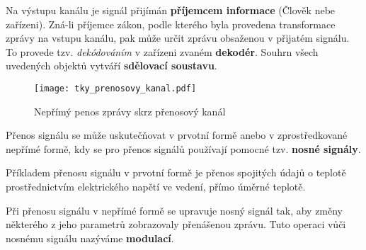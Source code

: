 {      Na výstupu kanálu je signál přijímán \textbf{příjemcem informace} (Člověk nebe zařízeni). 
      Zná-li příjemce zákon, podle kterého byla provedena transformace zprávy na vstupu kanálu, pak 
      může určit zprávu obsaženou v přijatém signálu. To provede tzv. \emph{dekódováním} v zařízeni 
      zvaném \textbf{dekodér}. Souhrn všech uvedených objektů vytváří \textbf{sdělovací soustavu}.

      \begin{figure}[ht!]
        \centering
        \texttt{[image: tky\_prenosovy\_kanal.pdf]}
        \caption{Nepřímý penos zprávy skrz přenosový kanál}
        \label{tky:fig002}
      \end{figure}

      Přenos signálu se může uskutečňovat v prvotní formě anebo v zprostředkované nepřímé formě, 
      kdy se pro přenos signálů používají pomocné tzv. \textbf{nosné signály}.
      
      Příkladem přenosu signálu v prvotní formě je přenos spojitých údajů o teplotě     
      prostřednictvím elektrického napětí ve vedení, přímo úměrné teplotě. 
      
      Při přenosu signálu v nepřímé formě se upravuje nosný signál tak, aby změny některého z jeho 
      parametrů zobrazovaly přenášenou zprávu. Tuto operaci vůči nosnému signálu nazýváme 
      \textbf{modulací}.
      
      
} %
\printbibliography[title={Seznam literatury}, heading=subbibliography]
